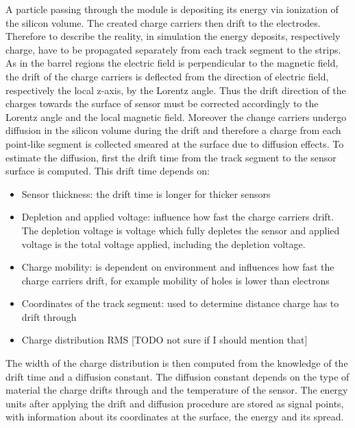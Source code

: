 A particle passing through the module is depositing its energy via ionization of the silicon volume. The created charge carriers then drift to the electrodes. Therefore to describe the reality, in simulation the energy deposits, respectively charge, have to be propagated separately from each track segment to the strips. As in the barrel regions the electric field is perpendicular to the magnetic field, the drift of the charge carriers is deflected from the direction of electric field, respectively the local z-axis, by the Lorentz angle. Thus the drift direction of the charges towards the surface of sensor must be corrected accordingly to the Lorentz angle and the local magnetic field. Moreover the change carriers undergo diffusion in the silicon volume during the drift and therefore a charge from each point-like segment is collected smeared at the surface due to diffusion effects. To estimate the diffusion, first the drift time from the track segment to the sensor surface is computed. This drift time depends on:

\begin{itemize}
\item Sensor thickness: the drift time is longer for thicker sensors
\item Depletion and applied voltage: influence how fast the charge carriers drift. The depletion voltage is voltage which fully depletes the sensor and applied voltage is the total voltage applied, including the depletion voltage.
\item Charge mobility: is dependent on environment and influences how fast the charge carriers drift, for example mobility of holes is lower than electrons
\item Coordinates of the track segment: used to determine distance charge has to drift through
\item Charge distribution RMS [TODO not sure if I should mention that] %
\end{itemize}

The width of the charge distribution is then computed from the knowledge of the drift time and a diffusion constant. The diffusion constant depends on the type of material the charge drifts through and the temperature of the sensor. The energy units after applying the drift and diffusion procedure are stored as signal points, with information about its coordinates at the surface, the energy and its spread.


